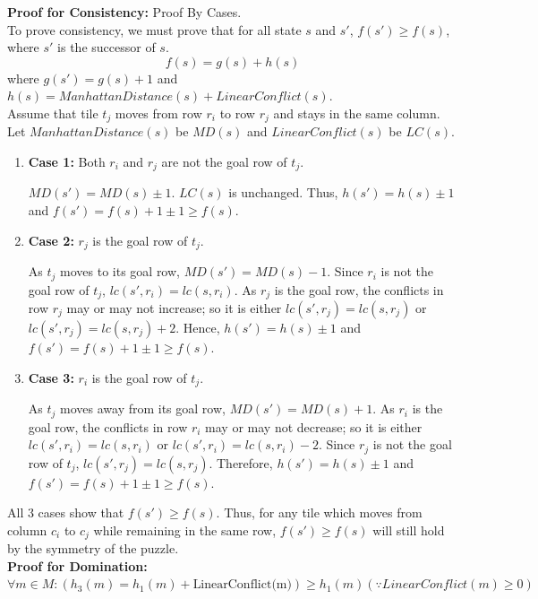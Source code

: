\documentclass[runningheads]{llncs}
\begin{document}
\textbf{Proof for Consistency:} Proof By Cases. \\
    To prove consistency, we must prove that for all state \( s \) and \( s' \), \( f(s') \geq f(s) \), where \( s' \) is the successor of \( s \).
\[
    f(s) = g(s) + h(s)
\]
where $g(s') = g(s) + 1$ and $h(s) = ManhattanDistance(s) + LinearConflict(s)$. \\
Assume that tile \( t_j \) moves from row \( r_i \) to row \( r_j \) and stays in the same column. Let \( ManhattanDistance(s) \) be \( MD(s) \) and \( LinearConflict(s) \) be \( LC(s) \). 
\begin{enumerate}
    \item \textbf{Case 1:} Both \( r_i \) and \( r_j \) are not the goal row of \( t_j \).
    
        \( MD(s') = MD(s) \pm 1 \). \( LC(s) \) is unchanged. Thus, \( h(s') = h(s) \pm 1 \) and \( f(s') = f(s) + 1 \pm 1 \geq f(s) \).
    
    \item \textbf{Case 2:} \( r_j \) is the goal row of \( t_j \).
        
        As \( t_j \) moves to its goal row, \( MD(s') = MD(s) - 1 \). Since \( r_i \) is not the goal row of \( t_j \), \( lc(s', r_i) = lc(s, r_i) \). 
        As \( r_j \) is the goal row, the conflicts in row \( r_j \) may or may not increase; so it is either \( lc(s', r_j) = lc(s, r_j) \) or \( lc(s', r_j) = lc(s, r_j) + 2 \). 
        Hence, \( h(s') = h(s) \pm 1 \) and \( f(s') = f(s) + 1 \pm 1 \geq f(s) \).

    \item \textbf{Case 3:} \( r_i \) is the goal row of \( t_j \).
    
        As \( t_j \) moves away from its goal row, \( MD(s') = MD(s) + 1 \). 
        As \( r_i \) is the goal row, the conflicts in row \( r_i \) may or may not decrease; so it is either \( lc(s', r_i) = lc(s, r_i) \) or \( lc(s', r_i) = lc(s, r_i) - 2 \). 
        Since \( r_j \) is not the goal row of \( t_j \), \( lc(s', r_j) = lc(s, r_j) \). 
        Therefore, \( h(s') = h(s) \pm 1 \) and \( f(s') = f(s) + 1 \pm 1 \geq f(s) \).
\end{enumerate}
All 3 cases show that \( f(s') \geq f(s) \). Thus, for any tile which moves from column \( c_i \) to \( c_j \) while remaining in the same row, \( f(s') \geq f(s) \) will still hold by the symmetry of the puzzle. \\
\textbf{Proof for Domination:} \( \forall m \in M: (h_3(m) = h_1(m) + \text{LinearConflict(m)}) \geq h_{1}(m) (\because LinearConflict(m) \geq 0) \)
\end{document}
